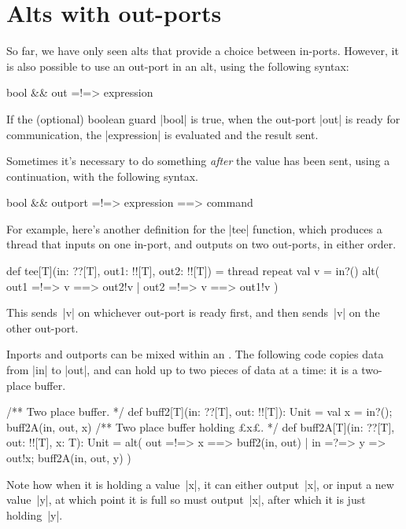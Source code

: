 \section{Alts with out-ports}

So far, we have only seen alts that provide a choice between in-ports.
However, it is also possible to use an out-port in an alt, using the following
syntax:%
%
\begin{scala}
  bool && out =!=> { expression }
\end{scala}
%
If the (optional) boolean guard |bool| is true, when the out-port |out| is
ready for communication, the |expression| is evaluated and the result sent.

Sometimes it's necessary to do something \emph{after} the value has been sent,
using a continuation, with the following syntax.
%
\begin{scala}
   bool && outport =!=> { expression } ==> { command }
\end{scala}

For example, here's another definition for the |tee| function, which produces
a thread that inputs on one in-port, and outputs on two out-ports, in either
order. 
%
\begin{mysamepage}
\begin{scala}
def tee[T](in: ??[T], out1: !![T], out2: !![T]) = thread{
  repeat{ 
    val v = in?()
    alt( out1 =!=> { v } ==> { out2!v }
       | out2 =!=> { v } ==> { out1!v }
    )
  }
}
\end{scala}
%
This sends~|v| on whichever out-port is ready first, and then sends~|v| on the
other out-port.
\end{mysamepage}


Inports and outports can be mixed within an .
%
The following code copies data from |in| to |out|, and can hold up to two
pieces of data at a time: it is a two-place buffer. 
%
\begin{scala}  
  /** Two place buffer. */
  def buff2[T](in: ??[T], out: !![T]): Unit = {
    val x = in?(); buff2A(in, out, x)
  }
  /** Two place buffer holding £x£. */
  def buff2A[T](in: ??[T], out: !![T], x: T): Unit = {
    alt(
      out =!=> { x } ==> { buff2(in, out) }
      | in =?=> { y => out!x; buff2A(in, out, y) }
    )
  }  
\end{scala}
%
Note how when it is holding a value~|x|, it can either output~|x|, or input a
new value~|y|, at which point it is full so must output~|x|, after which it is
just holding~|y|.


